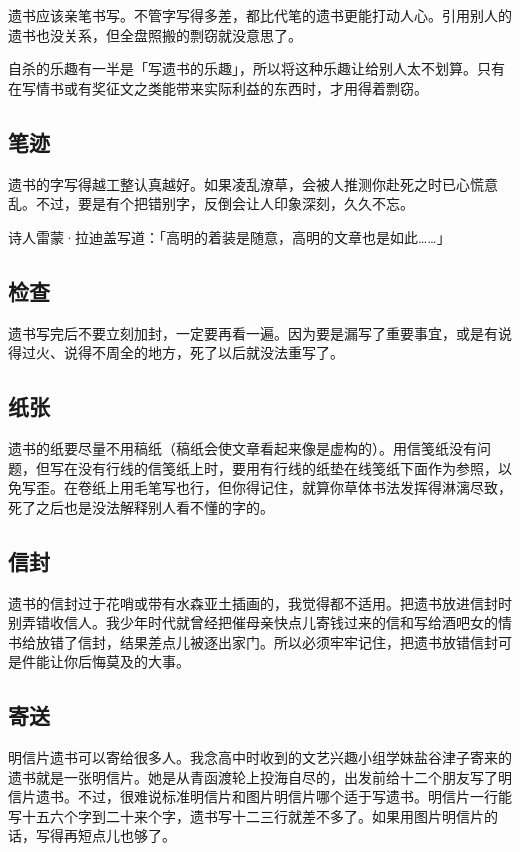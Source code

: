 \documentclass[UTF8]{ctexart}
\begin{document}
遗书应该亲笔书写。不管字写得多差，都比代笔的遗书更能打动人心。引用别人的遗书也没关系，但全盘照搬的剽窃就没意思了。

自杀的乐趣有一半是「写遗书的乐趣」，所以将这种乐趣让给别人太不划算。只有在写情书或有奖征文之类能带来实际利益的东西时，才用得着剽窃。

\subsection{笔迹}

遗书的字写得越工整认真越好。如果凌乱潦草，会被人推测你赴死之时已心慌意乱。不过，要是有个把错别字，反倒会让人印象深刻，久久不忘。

诗人雷蒙·拉迪盖写道：「高明的着装是随意，高明的文章也是如此……」

\subsection{检查}

遗书写完后不要立刻加封，一定要再看一遍。因为要是漏写了重要事宜，或是有说得过火、说得不周全的地方，死了以后就没法重写了。

\subsection{纸张}

遗书的纸要尽量不用稿纸（稿纸会使文章看起来像是虚构的）。用信笺纸没有问题，但写在没有行线的信笺纸上时，要用有行线的纸垫在线笺纸下面作为参照，以免写歪。在卷纸上用毛笔写也行，但你得记住，就算你草体书法发挥得淋漓尽致，死了之后也是没法解释别人看不懂的字的。

\subsection{信封}

遗书的信封过于花哨或带有水森亚土插画的，我觉得都不适用。把遗书放进信封时别弄错收信人。我少年时代就曾经把催母亲快点儿寄钱过来的信和写给酒吧女的情书给放错了信封，结果差点儿被逐出家门。所以必须牢牢记住，把遗书放错信封可是件能让你后悔莫及的大事。

\subsection{寄送}

明信片遗书可以寄给很多人。我念高中时收到的文艺兴趣小组学妹盐谷津子寄来的遗书就是一张明信片。她是从青函渡轮上投海自尽的，出发前给十二个朋友写了明信片遗书。不过，很难说标准明信片和图片明信片哪个适于写遗书。明信片一行能写十五六个字到二十来个字，遗书写十二三行就差不多了。如果用图片明信片的话，写得再短点儿也够了。
\end{document}
